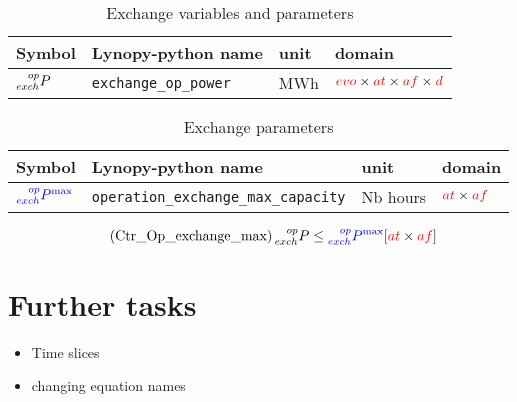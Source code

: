 \documentclass{article}
\begin{document}
\begin{table}[h]
\footnotesize %
  \centering
    \caption{Exchange variables and parameters}
  \begin{tabular}{llll}
    \hline
    
    \textbf{Symbol} & \textbf{Lynopy-python name} & \textbf{unit}  & \textbf{domain} \\ \hline
    
    $ \prescript{op}{exch}{P}$ & \verb|exchange_op_power|  & MWh & $\textcolor{red}{evo} \times \textcolor{red}{at} \times  \textcolor{red}{af} \times \textcolor{red}{d}$  \\
    
  \end{tabular}
\end{table}


  \begin{table}[h]
\footnotesize %
  \centering

\caption{Exchange parameters}


\begin{tabular}{llll}
\hline
    \textbf{Symbol} & \textbf{Lynopy-python name} & \textbf{unit}  & \textbf{domain} \\ \hline
    
    $\textcolor{blue}{\prescript{op}{exch}{P^{\max}}}$&  \verb|operation_exchange_max_capacity| & Nb hours & $\textcolor{red}{at} \times \textcolor{red}{af} $ \\ 
  \end{tabular}
\end{table}

\begin{equation} \tag{Ctr\_Op\_exchange\_max}
   \prescript{op}{exch}{P} \leq \textcolor{blue}{\prescript{op}{exch}{P^{\max}}}  \hfill [ \textcolor{red}{at} \times \textcolor{red}{af}]
\label{eq:Ctr_Op_exchange_max}
\end{equation}




\section{Further tasks}
\begin{itemize}
    \item Time slices 
    \item changing equation names 
\end{itemize}
\end{document}
